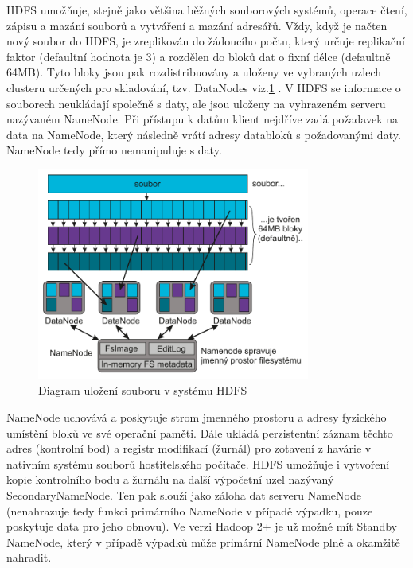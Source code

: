 \documentclass[thesis=M,czech]{FITthesis}[2012/06/26]
\begin{document}
HDFS umožňuje, stejně jako většina běžných souborových systémů, operace čtení, zápisu a mazání souborů a vytváření a mazání adresářů. Vždy, když je načten nový soubor do HDFS, je zreplikován do žádoucího počtu, který určuje replikační faktor (defaultní hodnota je 3) a rozdělen do bloků dat o fixní délce (defaultně 64MB). Tyto bloky jsou pak rozdistribuovány a uloženy  ve vybraných uzlech clusteru určených pro skladování, tzv. DataNodes viz.\ref{fig:hdfs} . V HDFS se informace o souborech neukládají společně s daty, ale jsou uloženy na vyhrazeném serveru nazývaném NameNode. Při přístupu k datům klient nejdříve zadá požadavek na data na NameNode, který následně vrátí adresy databloků s požadovanými daty. NameNode tedy přímo nemanipuluje s daty.

\begin{figure}\centering
	\includegraphics[width=0.8\textwidth, angle=0]{files/hdfs}
	\caption[Diagram uložení souboru v systému HDFS]{Diagram uložení souboru v systému HDFS}\label{fig:hdfs}
\end{figure}

NameNode uchovává a poskytuje strom jmenného prostoru a adresy fyzického umístění bloků ve své operační paměti. Dále ukládá perzistentní záznam těchto adres (kontrolní bod) a registr modifikací (žurnál) pro zotavení z havárie v nativním systému souborů hostitelského počítače. HDFS umožňuje i  vytvoření kopie kontrolního bodu a žurnálu na další výpočetní uzel nazývaný SecondaryNameNode. Ten pak slouží jako záloha dat serveru NameNode  (nenahrazuje tedy funkci primárního NameNode v případě výpadku, pouze poskytuje data pro jeho obnovu). Ve verzi Hadoop 2+ je už možné mít Standby NameNode, který v případě výpadků může primární NameNode plně a okamžitě nahradit. 
\end{document}

